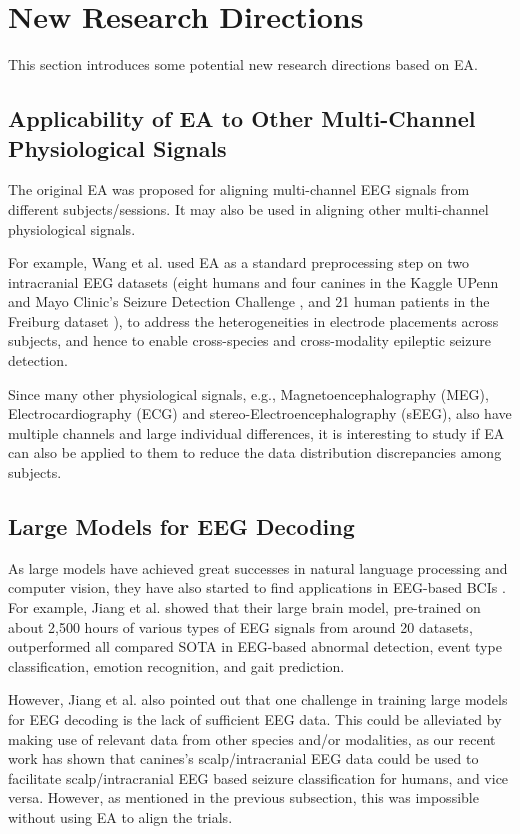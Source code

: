 \documentclass[journal]{IEEEtran}
\begin{document}
\section{New Research Directions} \label{sect:future}

This section introduces some potential new research directions based on EA.


\subsection{Applicability of EA to Other Multi-Channel Physiological Signals}

The original EA was proposed for aligning multi-channel EEG signals from different subjects/sessions. It may also be used in aligning other multi-channel physiological signals.

For example, Wang et al. \cite{drwuNSR2025} used EA as a standard preprocessing step on two intracranial EEG datasets (eight humans and four canines in the Kaggle UPenn and Mayo Clinic's Seizure Detection Challenge \cite{Baldassano2017}, and 21 human patients in the Freiburg dataset \cite{Ihle2012}), to address the heterogeneities in electrode placements across subjects, and hence to enable cross-species and cross-modality epileptic seizure detection.

Since many other physiological signals, e.g., Magnetoencephalography (MEG), Electrocardiography (ECG) and stereo-Electroencephalography (sEEG), also have multiple channels and large individual differences, it is interesting to study if EA can also be applied to them to reduce the data distribution discrepancies among subjects.

\subsection{Large Models for EEG Decoding}

As large models have achieved great successes in natural language processing and computer vision, they have also started to find applications in EEG-based BCIs \cite{Jiang2024,Zhang2024a}. For example, Jiang et al. \cite{Jiang2024} showed that their large brain model, pre-trained on about 2,500 hours of various types of EEG signals from around 20 datasets, outperformed all compared SOTA in EEG-based abnormal detection, event type classification, emotion recognition, and gait prediction.

However, Jiang et al. \cite{Jiang2024} also pointed out that one challenge in training large models for EEG decoding is the lack of sufficient EEG data. This could be alleviated by making use of relevant data from other species and/or modalities, as our recent work \cite{drwuNSR2025} has shown that canines's scalp/intracranial EEG data could be used to facilitate scalp/intracranial EEG based seizure classification for humans, and vice versa. However, as mentioned in the previous subsection, this was impossible without using EA to align the trials.
\end{document}
